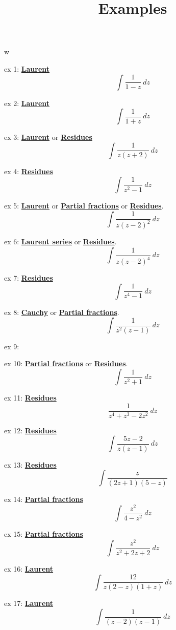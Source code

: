 w\documentclass[11pt, oneside]{article}
\title{Examples}
\date{}
\begin{document}
\maketitle
\large


ex 1:  \hyperref[sec:series_cheatsheet]{\textbf{Laurent}}
\[ \int \frac{1}{1 - z} \ dz \]

ex 2:  \hyperref[sec:series_cheatsheet]{\textbf{Laurent}}
\[ \int \frac{1}{1 + z} \ dz \]

ex 3:    \hyperref[sec:ex3L]{\textbf{Laurent}} or \hyperref[sec:ex3R]{\textbf{Residues}}
\[ \int \frac{1}{z(z + 2)} \ dz \]

ex 4:  \hyperref[sec:ex4R]{\textbf{Residues}} 
\[ \int \frac{1}{z^2 - 1} \ dz \]

ex 5:  \hyperref[sec:ex5L]{\textbf{Laurent}} or \hyperref[sec:ex5PF]{\textbf{Partial fractions}} or \hyperref[sec:ex5R]{\textbf{Residues}}.
\[ \int \frac{1}{z(z - 2)^2} \ dz \]

ex 6:  \hyperref[sec:ex6L]{\textbf{Laurent series}} or \hyperref[sec:ex6R]{\textbf{Residues}}.
\[ \int \frac{1}{z(z - 2)^4} \ dz \]

ex 7: \hyperref[sec:ex7R]{\textbf{Residues}} 
\[ \int \frac{1}{z^4 - 1} \ dz \]

ex 8:  \hyperref[sec:ex8C]{\textbf{Cauchy}} or \hyperref[sec:ex8PF]{\textbf{Partial fractions}}.
\[ \int \frac{1}{z^2(z - 1)} \ dz \]

ex 9:  

ex 10:  \hyperref[sec:ex10PF]{\textbf{Partial fractions}} or \hyperref[sec:ex10R]{\textbf{Residues}}.
\[ \int \frac{1}{z^2 + 1} \ dz \]

ex 11:  \hyperref[sec:ex11R]{\textbf{Residues}} 
\[ \frac{1}{z^4 + z^3 - 2z^2} \ dz \]

ex 12:  \hyperref[sec:ex12R]{\textbf{Residues}} 
\[ \int \frac{5z - 2}{z(z - 1)} \ dz \]

ex 13:   \hyperref[sec:ex13R]{\textbf{Residues}} 
\[ \int \frac{z}{(2z + 1)(5 - z)} \]

ex 14:  \hyperref[sec:ex14PF]{\textbf{Partial fractions}} 
\[ \int \frac{z^2}{4 - z^2} \ dz \]

ex 15:  \hyperref[sec:ex15PF]{\textbf{Partial fractions}} 
\[ \int \frac{z^2}{z^2 + 2z + 2} \ dz \]

ex 16:  \hyperref[sec:ex16L]{\textbf{Laurent}}
\[ \int \frac{12}{z(2 - z)(1 + z)} \ dz \]

ex 17:  \hyperref[sec:ex17L]{\textbf{Laurent}}
\[ \int \frac{1}{(z - 2)(z - 1)} \ dz \]
\end{document}
